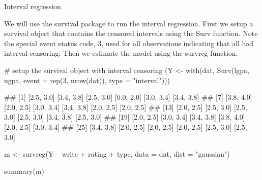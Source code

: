 Interval regression

We will use the survival package to run the interval regression. First we setup a survival object that contains the censored intervals using the Surv function. Note the special event status code, 3, used for all observations indicating that all had interval censoring. Then we estimate the model using the survreg function.
 


# setup the survival object with interval censoring
(Y <- with(dat, Surv(lgpa, ugpa, event = rep(3, nrow(dat)), type = "interval")))

##  [1] [2.5, 3.0] [3.4, 3.8] [2.5, 3.0] [0.0, 2.0] [3.0, 3.4] [3.4, 3.8]
##  [7] [3.8, 4.0] [2.0, 2.5] [3.0, 3.4] [3.4, 3.8] [2.0, 2.5] [2.0, 2.5]
## [13] [2.0, 2.5] [2.5, 3.0] [2.5, 3.0] [2.5, 3.0] [3.4, 3.8] [2.5, 3.0]
## [19] [2.0, 2.5] [3.0, 3.4] [3.4, 3.8] [3.8, 4.0] [2.0, 2.5] [3.0, 3.4]
## [25] [3.4, 3.8] [2.0, 2.5] [2.0, 2.5] [2.0, 2.5] [2.5, 3.0] [2.5, 3.0]

m <- survreg(Y ~ write + rating + type, data = dat, dist = "gaussian")

summary(m)


